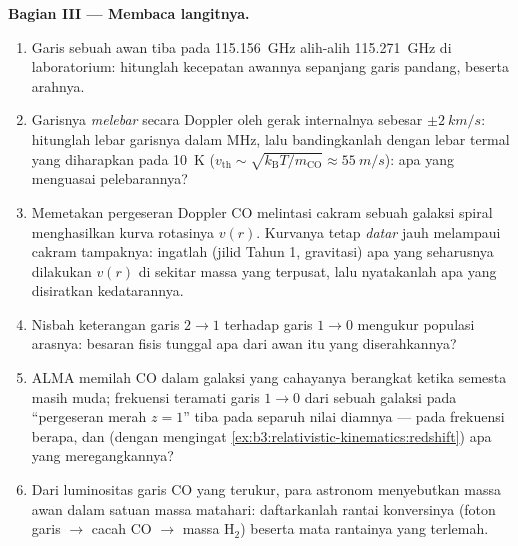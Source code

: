 \begin{problem}
\medskip\noindent\textbf{Bagian III --- Membaca langitnya.}
\begin{enumerate}[resume]
  \item Garis sebuah awan tiba pada \qty{115.156}{GHz} alih-alih
        \qty{115.271}{GHz} di laboratorium: hitunglah kecepatan awannya
        sepanjang garis pandang, beserta arahnya.
  \item Garisnya \emph{melebar} secara Doppler oleh gerak internalnya
        sebesar $\pm\qty{2}{km/s}$: hitunglah lebar garisnya dalam MHz,
        lalu bandingkanlah dengan lebar termal yang diharapkan pada
        \qty{10}{K} ($v_{\text{th}} \sim \sqrt{k_{\text{B}}T/m_{\text{CO}}}
        \approx \qty{55}{m/s}$): apa yang menguasai pelebarannya?
  \item Memetakan pergeseran Doppler CO melintasi cakram sebuah galaksi
        spiral menghasilkan kurva rotasinya $v(r)$. Kurvanya tetap
        \emph{datar} jauh melampaui cakram tampaknya: ingatlah (jilid
        Tahun 1, gravitasi) apa yang seharusnya dilakukan $v(r)$ di
        sekitar massa yang terpusat, lalu nyatakanlah apa yang
        disiratkan kedatarannya.
  \item Nisbah keterangan garis $2\to1$ terhadap garis $1\to0$
        mengukur populasi arasnya: besaran fisis tunggal apa dari awan
        itu yang diserahkannya?
  \item ALMA memilah CO dalam galaksi yang cahayanya berangkat ketika
        semesta masih muda; frekuensi teramati garis $1 \to 0$ dari
        sebuah galaksi pada ``pergeseran merah $z = 1$'' tiba pada
        separuh nilai diamnya --- pada frekuensi berapa, dan
        (dengan mengingat \cref{ex:b3:relativistic-kinematics:redshift})
        apa yang meregangkannya?
  \item Dari luminositas garis CO yang terukur, para astronom
        menyebutkan massa awan dalam satuan massa matahari:
        daftarkanlah rantai konversinya (foton garis $\to$ cacah CO
        $\to$ massa H$_2$) beserta mata rantainya yang terlemah.
\end{enumerate}


\end{problem}
